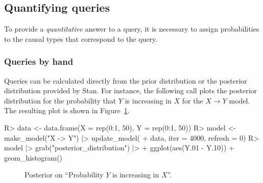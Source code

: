 \documentclass[
  11pt,
  article]{jss}
\begin{document}
\subsection{Quantifying queries}\label{quantifying-queries}

To provide a \emph{quantitative} answer to a query, it is necessary to
assign probabilities to the causal types that correspond to the query.

\subsubsection{Queries by hand}\label{queries-by-hand}

Queries can be calculated directly from the prior distribution or the
posterior distribution provided by Stan. For instance, the following
call plots the posterior distribution for the probability that \(Y\) is
increasing in \(X\) for the \(X \rightarrow Y\) model. The resulting
plot is shown in Figure~\ref{fig-posterior-dist}.

\begin{CodeInput}
R> data  <- data.frame(X = rep(0:1, 50), Y = rep(0:1, 50))
R> model <-  make_model("X -> Y") |> update_model(
+    data, iter = 4000, refresh = 0)
R> model |> grab("posterior_distribution")  |> 
+    ggplot(aes(Y.01 - Y.10)) + geom_histogram() 
\end{CodeInput}

\begin{figure}[t]


\caption{\label{fig-posterior-dist}Posterior on ``Probability \(Y\) is
increasing in \(X\)''.}

\end{figure}%
\end{document}
